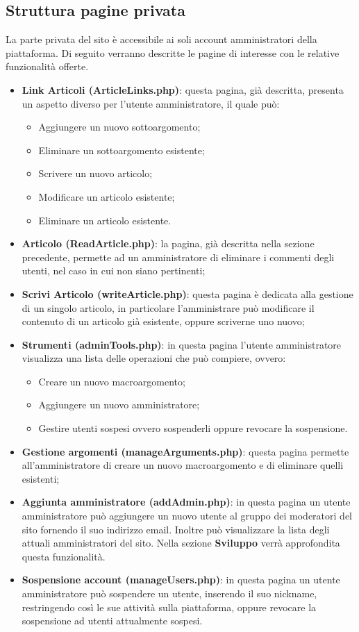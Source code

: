 \documentclass[12pt]{article}
\begin{document}
	\subsection{Struttura pagine privata}
	La parte privata del sito è accessibile ai soli account amministratori della piattaforma. Di seguito verranno descritte le pagine di interesse con le relative funzionalità offerte.
	\begin{itemize}
		\item \textbf{Link Articoli (ArticleLinks.php)}: questa pagina, già descritta, presenta un aspetto diverso per l'utente amministratore, il quale può:
		\begin{itemize}
			\item Aggiungere un nuovo sottoargomento;
			\item Eliminare un sottoargomento esistente;
			\item Scrivere un nuovo articolo;
			\item Modificare un articolo esistente;
			\item Eliminare un articolo esistente.
		\end{itemize}
		\item \textbf{Articolo (ReadArticle.php)}: la pagina, già descritta nella sezione precedente, permette ad un amministratore di eliminare i commenti degli utenti, nel caso in cui non siano pertinenti;
		\item \textbf{Scrivi Articolo (writeArticle.php)}: questa pagina è dedicata alla gestione di un singolo articolo, in particolare l'amministrare può modificare il contenuto di un articolo già esistente, oppure scriverne uno nuovo;
		\item \textbf{Strumenti (adminTools.php)}: in questa pagina l'utente amministratore visualizza una lista delle operazioni che può compiere, ovvero:
			\begin{itemize}
				\item Creare un nuovo macroargomento;
				\item Aggiungere un nuovo amministratore;
				\item Gestire utenti sospesi ovvero sospenderli oppure revocare la sospensione.
			\end{itemize}
		\item \textbf{Gestione argomenti (manageArguments.php)}: questa pagina permette all'amministratore di creare un nuovo macroargomento e di eliminare quelli esistenti;
		\item \textbf{Aggiunta amministratore (addAdmin.php)}: in questa pagina un utente amministratore può aggiungere un nuovo utente al gruppo dei moderatori del sito fornendo il suo indirizzo email. Inoltre può visualizzare la lista degli attuali amministratori del sito. Nella sezione \textbf{Sviluppo} verrà approfondita questa funzionalità.
		\item \textbf{Sospensione account (manageUsers.php)}: in questa pagina un utente amministratore può sospendere un utente, inserendo il suo nickname, restringendo così le sue attività sulla piattaforma, oppure revocare la sospensione ad utenti attualmente sospesi.
	\end{itemize}
\end{document}
